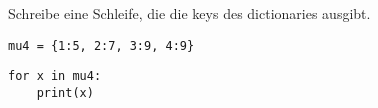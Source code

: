 \question[2] Schreibe eine Schleife, die die keys des dictionaries ausgibt.
\begin{lstlisting}
mu4 = {1:5, 2:7, 3:9, 4:9}
\end{lstlisting}
\begin{solutionbox}{2cm}
\begin{lstlisting}
for x in mu4:
    print(x)
\end{lstlisting}
\end{solutionbox}
